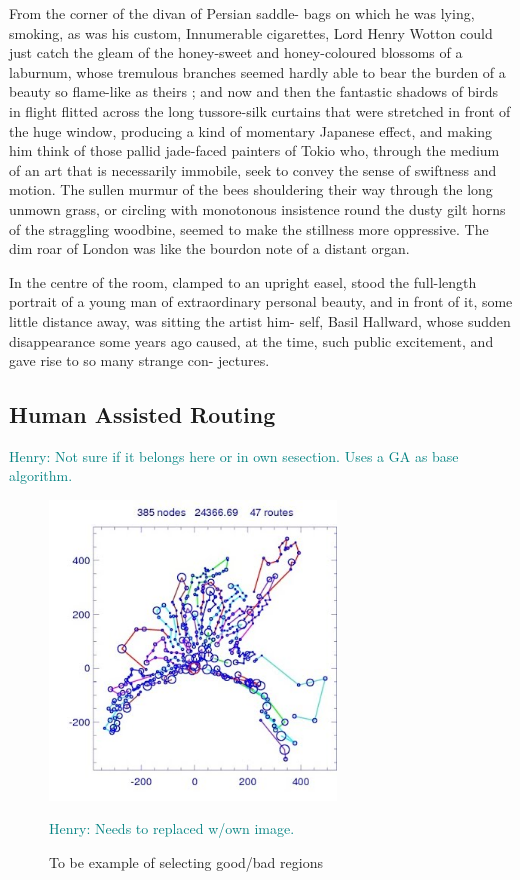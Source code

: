 \documentclass{sig-alternate}
\newcommand{\allcomments}[1]{{#1}}
\newcommand{\hfcomment}[1]{\textcolor{Teal}{\allcomments{Henry: {#1}}}}
\begin{document}
{From the corner of the divan of Persian saddle- 
bags on which he was lying, smoking, as was his 
custom, Innumerable cigarettes, Lord Henry Wotton 
could just catch the gleam of the honey-sweet and 
honey-coloured blossoms of a laburnum, whose 
tremulous branches seemed hardly able to bear the 
burden of a beauty so flame-like as theirs ; and 
now and then the fantastic shadows of birds in 
flight flitted across the long tussore-silk curtains 
that were stretched in front of the huge window, 
producing a kind of momentary Japanese effect, 
and making him think of those pallid jade-faced 
painters of Tokio who, through the medium of an 
art that is necessarily immobile, seek to convey the 
sense of swiftness and motion. The sullen murmur 
of the bees shouldering their way through the long 
unmown grass, or circling with monotonous insistence 
round the dusty gilt horns of the straggling woodbine, 
seemed to make the stillness more oppressive. The
dim roar of London was like the bourdon note of a 
distant organ. 

In the centre of the room, clamped to an upright 
easel, stood the full-length portrait of a young man 
of extraordinary personal beauty, and in front of it, 
some little distance away, was sitting the artist him- 
self, Basil Hallward, whose sudden disappearance 
some years ago caused, at the time, such public 
excitement, and gave rise to so many strange con- 
jectures. 

\subsection{Human Assisted Routing}
\label{sec:humans}
\hfcomment{Not sure if it belongs here or in own sesection. Uses a GA as base algorithm.}

\begin{figure}
\centering
\includegraphics[width=3in, keepaspectratio]{vrp2.jpg}
\caption{To be example of selecting good/bad regions}
\hfcomment{Needs to replaced w/own image.}
\label{fig:Humangraph}
\end{figure}

}
\end{document}
